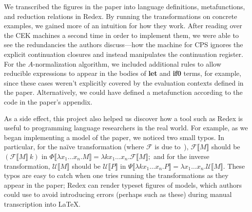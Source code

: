 \documentclass[11pt]{article}
\begin{document}
We transcribed the figures in the paper into language definitions,
metafunctions, and reduction relations in Redex. By running the transformations
on concrete examples, we gained more of an intuition for how they work. After
reading over the CEK machines a second time in order to implement them, we were
able to see the redundancies the authors discuss---how the machine for CPS
ignores the explicit continuation closures and instead manipulates the
continuation register. For the $A$-normalization algorithm, we included
additional rules to allow reducible expressions to appear in the bodies of
\textbf{let} and \textbf{if0} terms, for example, since these cases weren't
explicitly covered by the evaluation contexts defined in the paper.
Alternatively, we could have defined a metafunction according to the code in
the paper's appendix.

As a side effect, this project also helped us discover how a tool such as Redex
is useful to programming language researchers in the real world. For example,
as we began implementing a model of the paper, we noticed two small typos. In
particular, for the na\"{i}ve transformation (where $\mathcal{F}$ is due
to~\citet{Fischer:1993ys}), $\mathcal{F}\llbracket{M\rrbracket}$ should be
$(\mathcal{F}\llbracket{M\rrbracket}\ k)$ in
$\Phi\llbracket{\lambda{x_1 \ldots x_n}.M\rrbracket} =
\lambda{k x_1 \ldots x_n}.\mathcal{F}\llbracket{M\rrbracket};$
and for the inverse transformation,
$\mathcal{U}\llbracket{M\rrbracket}$ should be
$\mathcal{U}\llbracket{P\rrbracket}$ in
$\Psi\llbracket{\lambda{k x_1 \ldots x_n}.P\rrbracket} =
\lambda{x_1 \ldots x_n}.\mathcal{U}\llbracket{M\rrbracket}.$
These typos are easy to catch when one tries running the transformations as
they appear in the paper; Redex can render typeset figures of models, which
authors could use to avoid introducing errors (perhaps such as these) during
manual transcription into \LaTeX.
%





\end{document}
